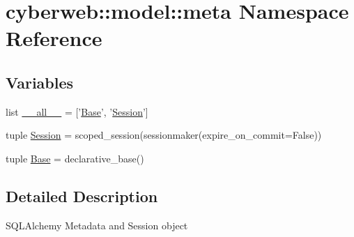 \hypertarget{namespacecyberweb_1_1model_1_1meta}{\section{cyberweb\-:\-:model\-:\-:meta \-Namespace \-Reference}
\label{namespacecyberweb_1_1model_1_1meta}
}
\subsection*{\-Variables}
\begin{DoxyCompactItemize}
\item 
list \hyperlink{namespacecyberweb_1_1model_1_1meta_aace23f3dc175f2b2c3517810f2bb6891}{\-\_\-\-\_\-all\-\_\-\-\_\-} = \mbox{[}'\hyperlink{namespacecyberweb_1_1model_1_1meta_aad31dc5abbb407ce088d01bbc854846f}{\-Base}', '\hyperlink{namespacecyberweb_1_1model_1_1meta_a6f814f2da18f69a468b99f93148d73ff}{\-Session}'\mbox{]}
\item 
tuple \hyperlink{namespacecyberweb_1_1model_1_1meta_a6f814f2da18f69a468b99f93148d73ff}{\-Session} = scoped\-\_\-session(sessionmaker(expire\-\_\-on\-\_\-commit=\-False))
\item 
tuple \hyperlink{namespacecyberweb_1_1model_1_1meta_aad31dc5abbb407ce088d01bbc854846f}{\-Base} = declarative\-\_\-base()
\end{DoxyCompactItemize}


\subsection{\-Detailed \-Description}
\begin{DoxyVerb}SQLAlchemy Metadata and Session object\end{DoxyVerb}
 

